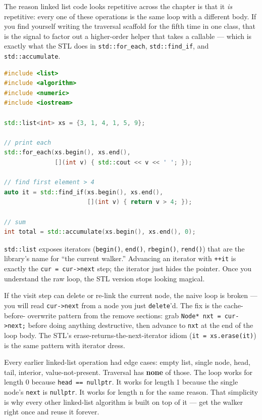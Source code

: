 \documentclass[11pt]{article}
\begin{document}
The reason linked list code looks repetitive across the chapter
is that it \emph{is} repetitive: every one of these operations
is the same loop with a different body. If you find yourself
writing the traversal scaffold for the fifth time in one class,
that is the signal to factor out a higher-order helper that takes
a callable --- which is exactly what the STL does in
\texttt{std::for\_each}, \texttt{std::find\_if}, and
\texttt{std::accumulate}.

\begin{examplebox}
\begin{lstlisting}[language=C++,basicstyle=\ttfamily\small,frame=single]
#include <list>
#include <algorithm>
#include <numeric>
#include <iostream>

std::list<int> xs = {3, 1, 4, 1, 5, 9};

// print each
std::for_each(xs.begin(), xs.end(),
              [](int v) { std::cout << v << ' '; });

// find first element > 4
auto it = std::find_if(xs.begin(), xs.end(),
                       [](int v) { return v > 4; });

// sum
int total = std::accumulate(xs.begin(), xs.end(), 0);
\end{lstlisting}
\end{examplebox}

\texttt{std::list} exposes iterators (\texttt{begin()},
\texttt{end()}, \texttt{rbegin()}, \texttt{rend()}) that are the
library's name for ``the current walker.'' Advancing an iterator
with \texttt{++it} is exactly the \texttt{cur = cur->next} step;
the iterator just hides the pointer. Once you understand the raw
loop, the STL version stops looking magical.

\begin{warnbox}
If the visit step can delete or re-link the current node, the
naive loop is broken --- you will read \texttt{cur->next} from a
node you just \texttt{delete}'d. The fix is the cache-before-
overwrite pattern from the remove sections: grab
\texttt{Node* nxt = cur->next;} before doing anything destructive,
then advance to \texttt{nxt} at the end of the loop body. The
STL's erase-returns-the-next-iterator idiom
(\texttt{it = xs.erase(it)}) is the same pattern with iterator
dress.
\end{warnbox}

\begin{ideabox}
Every earlier linked-list operation had edge cases: empty list,
single node, head, tail, interior, value-not-present. Traversal
has \textbf{none} of those. The loop works for length 0 because
\texttt{head == nullptr}. It works for length 1 because the
single node's \texttt{next} is \texttt{nullptr}. It works for
length n for the same reason. That simplicity is why every other
linked-list algorithm is built on top of it --- get the walker
right once and reuse it forever.
\end{ideabox}
\end{document}
